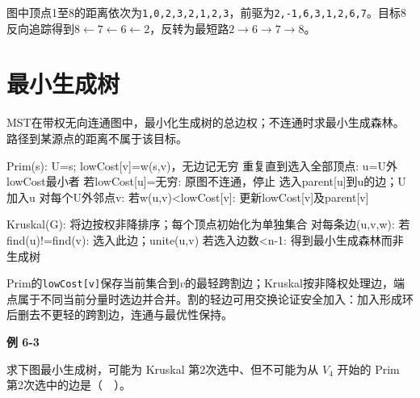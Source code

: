 图中顶点1至8的距离依次为\texttt{1,\allowbreak{}0,\allowbreak{}2,\allowbreak{}3,\allowbreak{}2,\allowbreak{}1,\allowbreak{}2,\allowbreak{}3}，前驱为\texttt{2,\allowbreak{}-1,\allowbreak{}6,\allowbreak{}3,\allowbreak{}1,\allowbreak{}2,\allowbreak{}6,\allowbreak{}7}。目标8反向追踪得到\(8\leftarrow7\leftarrow6\leftarrow2\)，反转为最短路\(2\to6\to7\to8\)。

\section{最小生成树}\label{DS06-mst}

MST在带权无向连通图中，最小化生成树的总边权；不连通时求最小生成森林。路径到某源点的距离不属于该目标。

\par\smallskip\noindent\begin{minipage}{\linewidth}
\begin{codeblock}[language={}]
Prim(s):
    U={s}; lowCost[v]=w(s,v)，无边记无穷
    重复直到选入全部顶点:
        u=U外lowCost最小者
        若lowCost[u]=无穷: 原图不连通，停止
        选入parent[u]到u的边；U加入u
        对每个U外邻点v:
            若w(u,v)<lowCost[v]: 更新lowCost[v]及parent[v]
\end{codeblock}
\end{minipage}\par\smallskip

\par\smallskip\noindent\begin{minipage}{\linewidth}
\begin{codeblock}[language={}]
Kruskal(G):
    将边按权非降排序；每个顶点初始化为单独集合
    对每条边(u,v,w):
        若find(u)!=find(v):
            选入此边；unite(u,v)
    若选入边数<n-1: 得到最小生成森林而非生成树
\end{codeblock}
\end{minipage}\par\smallskip

Prim的\texttt{lowCost[\allowbreak{}v]\allowbreak{}}保存当前集合到\(v\)的最轻跨割边；Kruskal按非降权处理边，端点属于不同当前分量时选边并合并。割的轻边可用交换论证安全加入：加入形成环后删去不更轻的跨割边，连通与最优性保持。

\par\medskip{}\noindent\hypertarget{DS06-E03}{}\label{DS06-E03}\textbf{例 6-3}\par\nobreak\smallskip

求下图最小生成树，可能为 Kruskal 第2次选中、但不可能为从 \(V_4\) 开始的 Prim 第2次选中的边是（　）。

